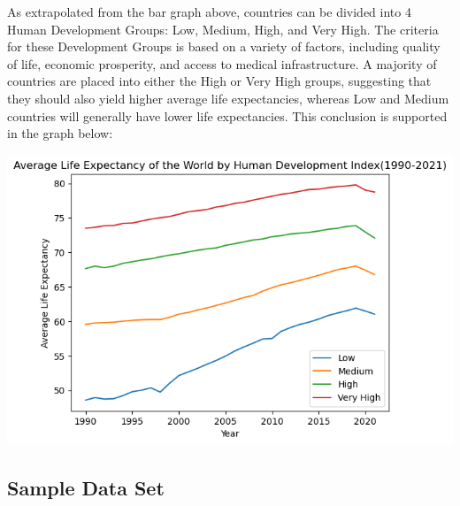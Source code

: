 \documentclass[twocolumn, switch]{article}
\begin{document}
As extrapolated from the bar graph above, countries can be divided into 4 Human Development Groups: Low, Medium, High, and Very High. The criteria for these Development Groups is based on a variety of factors, including quality of life, economic prosperity, and access to medical infrastructure. A majority of countries are placed into either the High or Very High groups, suggesting that they should also yield higher average life expectancies, whereas Low and Medium countries will generally have lower life expectancies. This conclusion is supported in the graph below:

\includegraphics[width=0.7\linewidth]{files/ae930fdd7fbb8fa24ba29225b51cd6b8.png}

\subsection{Sample Data Set}
\end{document}
